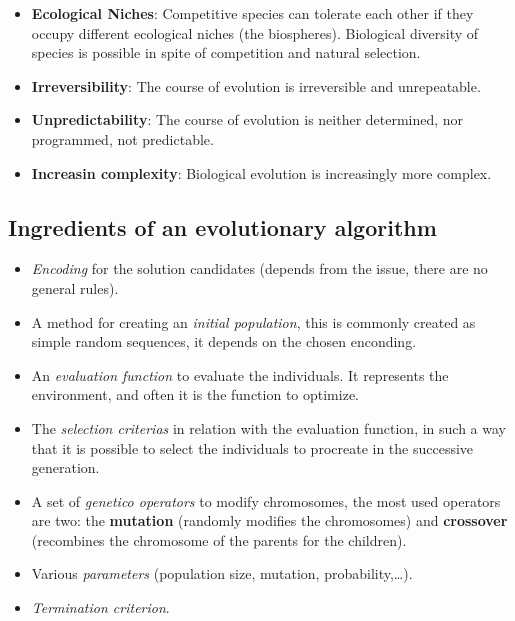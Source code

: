 \documentclass{article}
\begin{document}
\begin{itemize}
    \item \textbf{Ecological Niches}: Competitive species can tolerate each other if they occupy different
          ecological niches (the biospheres). Biological diversity of species is possible in spite of competition
          and natural selection.
    \item \textbf{Irreversibility}: The course of evolution is irreversible and unrepeatable.
    \item \textbf{Unpredictability}: The course of evolution is neither determined, nor programmed, not predictable.
    \item \textbf{Increasin complexity}: Biological evolution is increasingly more complex.
\end{itemize}

\subsection{Ingredients of an evolutionary algorithm}
\begin{itemize}
    \item \textit{Encoding} for the solution candidates (depends from the issue, there are no
          general rules).
    \item A method for creating an \textit{initial population}, this is commonly created
          as simple random sequences, it depends on the chosen enconding.
    \item An \textit{evaluation function} to evaluate the individuals. It represents the
          environment, and often it is the function to optimize.
    \item The \textit{selection criterias} in relation with the evaluation function,
          in such a way that it is possible to select the individuals to procreate in the
          successive generation.
    \item A set of \textit{genetico operators} to modify chromosomes, the most used
          operators are two: the \textbf{mutation} (randomly modifies the
          chromosomes) and \textbf{crossover} (recombines the chromosome of the parents for
          the children).
    \item Various \textit{parameters} (population size, mutation, probability,\dots).
    \item \textit{Termination criterion}.
\end{itemize}
\end{document}
